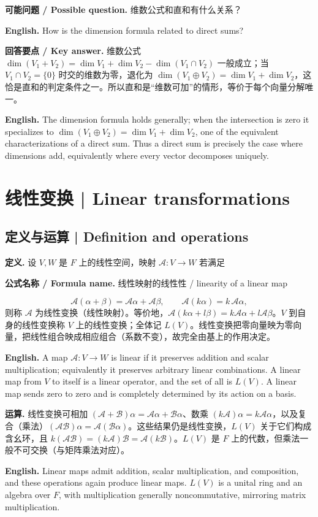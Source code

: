 \documentclass[UTF8,11pt,a4paper]{ctexart}
\newcommand{\EN}[1]{\par\noindent\textbf{English.} #1\par}
\newcommand{\FORMULA}[2]{\par\noindent\textbf{公式名称 / Formula name.} #1 / #2\par}
\newcommand{\ASK}[4]{\par\noindent\textbf{可能问题 / Possible question.} #1\par\EN{#2}\noindent\textbf{回答要点 / Key answer.} #3\par\EN{#4}\medskip}
\begin{document}
\ASK{维数公式和直和有什么关系？}{How is the dimension formula related to direct sums?}{维数公式 $\dim(V_1+V_2)=\dim V_1+\dim V_2-\dim(V_1\cap V_2)$ 一般成立；当 $V_1\cap V_2=\{0\}$ 时交的维数为零，退化为 $\dim(V_1\oplus V_2)=\dim V_1+\dim V_2$，这恰是直和的判定条件之一。所以直和是“维数可加”的情形，等价于每个向量分解唯一。}{The dimension formula holds generally; when the intersection is zero it specializes to $\dim(V_1\oplus V_2)=\dim V_1+\dim V_2$, one of the equivalent characterizations of a direct sum. Thus a direct sum is precisely the case where dimensions add, equivalently where every vector decomposes uniquely.}

\section{线性变换 | Linear transformations}
\subsection{定义与运算 | Definition and operations}
\noindent\textbf{定义.} 设 $V,W$ 是 $F$ 上的线性空间，映射 $\mathcal A:V\to W$ 若满足
\FORMULA{线性映射的线性性}{linearity of a linear map}
\[
\mathcal A(\alpha+\beta)=\mathcal A\alpha+\mathcal A\beta,\qquad \mathcal A(k\alpha)=k\,\mathcal A\alpha,
\]
则称 $\mathcal A$ 为线性变换（线性映射）。等价地，$\mathcal A(k\alpha+l\beta)=k\mathcal A\alpha+l\mathcal A\beta$。$V$ 到自身的线性变换称 $V$ 上的线性变换；全体记 $L(V)$。线性变换把零向量映为零向量，把线性组合映成相应组合（系数不变），故完全由基上的作用决定。
\EN{A map $\mathcal A:V\to W$ is linear if it preserves addition and scalar multiplication; equivalently it preserves arbitrary linear combinations. A linear map from $V$ to itself is a linear operator, and the set of all is $L(V)$. A linear map sends zero to zero and is completely determined by its action on a basis.}
\noindent\textbf{运算.} 线性变换可相加 $(\mathcal A+\mathcal B)\alpha=\mathcal A\alpha+\mathcal B\alpha$、数乘 $(k\mathcal A)\alpha=k\mathcal A\alpha$，以及复合（乘法）$(\mathcal A\mathcal B)\alpha=\mathcal A(\mathcal B\alpha)$。这些结果仍是线性变换，$L(V)$ 关于它们构成含幺环，且 $k(\mathcal A\mathcal B)=(k\mathcal A)\mathcal B=\mathcal A(k\mathcal B)$。$L(V)$ 是 $F$ 上的代数，但乘法一般不可交换（与矩阵乘法对应）。
\EN{Linear maps admit addition, scalar multiplication, and composition, and these operations again produce linear maps. $L(V)$ is a unital ring and an algebra over $F$, with multiplication generally noncommutative, mirroring matrix multiplication.}
\end{document}
